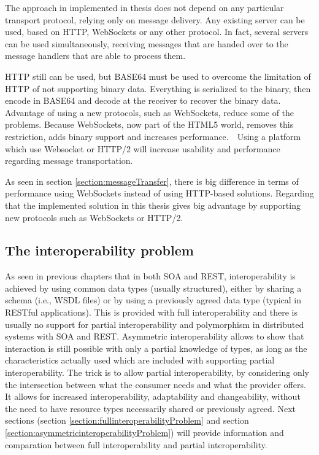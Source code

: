 The approach in implemented in thesis does not depend on any particular transport protocol, relying only on message delivery. Any existing server can be used, based on HTTP, WebSockets or any other protocol. In fact, several servers can be used simultaneously, receiving messages that are handed over to the message handlers that are able to process them.

HTTP still can be used, but BASE64 must be used to overcome the limitation of HTTP of not supporting binary data. Everything is serialized to the binary, then encode in BASE64 and decode at the receiver to recover the binary data. Advantage of using a new protocols, such as WebSockets, reduce some of the problems. Because WebSockets, now part of the HTML5 world, removes this restriction, adds binary support and increases performance.   Using a platform which use Websocket or HTTP/2 will increase usability and performance regarding message transportation.

As seen in section \ref{section:messageTransfer}, there is big difference in terms of performance using WebSockets instead of using HTTP-based solutions. Regarding that the implemented solution in this thesis gives big advantage by supporting new protocols such as WebSockets or HTTP/2.

\subsection{The interoperability problem}
\label{section:interoperabilityProblem}

As seen in previous chapters that in both SOA and REST, interoperability is achieved by using common data types (usually structured), either by sharing a schema (i.e., WSDL files) or by using a previously agreed data type (typical in RESTful applications). This is provided with full interoperability and there is usually no support for partial interoperability and polymorphism in distributed systems with SOA and REST. Asymmetric interoperability allows to show that interaction is still possible with only a partial knowledge of types, as long as the characteristics actually used which are included with supporting partial interoperability. The trick is to allow partial interoperability, by considering only the intersection between what the consumer needs and what the provider offers. It allows for increased interoperability, adaptability and changeability, without the need to have resource types necessarily shared or previously agreed. Next sections (section \ref{section:fullinteroperabilityProblem} and section \ref{section:asymmetricinteroperabilityProblem}) will provide information and comparation between full interoperability and partial interoperability.

